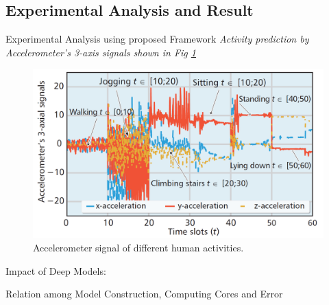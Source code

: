 \documentclass[newPxFont]{beamer}
\begin{document}
\subsection{Experimental Analysis and Result}
\begin{frame}[allowframebreaks]{Experimental Analysis using proposed Framework}
	\textit{Activity prediction by Accelerometer's 3-axis signals shown in Fig \ref{fig:activityPrediction}}
    \begin{figure}
		\centering
		\includegraphics[width=.75\linewidth]{resources/analysis1.png}
        \caption{Accelerometer signal of different human activities.}
        \label{fig:activityPrediction}
	\end{figure}
    
    \framebreak 
    
    \alert{Impact of Deep Models:}
    
    \begin{block}{Relation among Model Construction, 
    Computing Cores and Error}
    

\end{block}
\end{frame}
\end{document}
